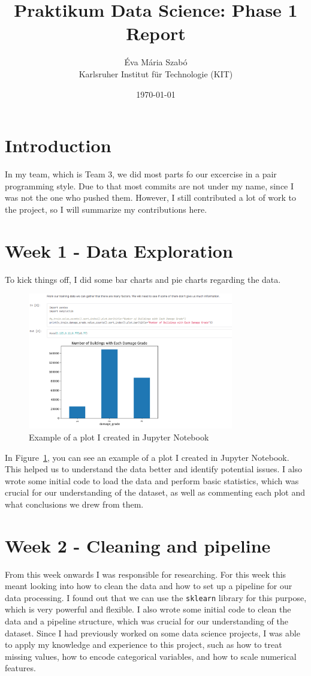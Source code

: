 \documentclass[a4paper,12pt]{article}
\title{Praktikum Data Science: Phase 1 Report}
\author{Éva Mária Szabó \\ \small Karlsruher Institut für Technologie (KIT)}
\date{\today}
\begin{document}
\maketitle
\tableofcontents
\newpage

\section{Introduction}
In my team, which is Team 3, we did most parts fo our excercise in a pair programming style. Due to that most commits are not under my name, since I was not the one who pushed them. However, I still contributed a lot of work to the project, so I will summarize my contributions here.

\section{Week 1 - Data Exploration}
To kick things off, I did some bar charts and pie charts regarding the data. 
\begin{figure}[h]
    \centering
    \includegraphics[width=0.8\textwidth]{figures/example_plot_jupyter.png}
    \caption{Example of a plot I created in Jupyter Notebook}
    \label{fig:data_exploration}
\end{figure}
In Figure~\ref{fig:data_exploration}, you can see an example of a plot I created in Jupyter Notebook. This helped us to understand the data better and identify potential issues.
I also wrote some initial code to load the data and perform basic statistics, which was crucial for our understanding of the dataset, as well as commenting each plot and what conclusions we drew from them.

\section{Week 2 - Cleaning and pipeline}
From this week onwards I was responsible for researching. For this week this meant looking into how to clean the data and how to set up a pipeline for our data processing. I found out that we can use the \texttt{sklearn} library for this purpose, which is very powerful and flexible. I also wrote some initial code to clean the data and a pipeline structure, which was crucial for our understanding of the dataset. Since I had previously worked on some data science projects, I was able to apply my knowledge and experience to this project, such as how to treat missing values, how to encode categorical variables, and how to scale numerical features.
\end{document}

